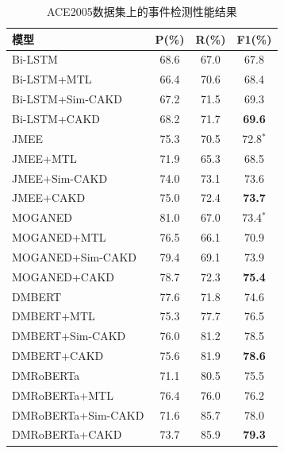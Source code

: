 \begin{table}[htp]
\centering
    \caption{ACE2005数据集上的事件检测性能结果}
	\begin{tabular}{lccc}
		\toprule
		模型 & P(\%) & R(\%) & F1(\%)  \\
		\midrule
		Bi-LSTM            & 68.6  & 67.0  & 67.8      \\
		Bi-LSTM+MTL            & 66.4  & 70.6  & 68.4        \\
		Bi-LSTM+Sim-CAKD   & 67.2  & 71.5  & 69.3      \\
        Bi-LSTM+CAKD   & 68.2  & 71.7  & \textbf{69.6}      \\
        \midrule
		JMEE           & 75.3  & 70.5  & 72.8$^*$      \\
		JMEE+MTL            & 71.9  & 65.3  & 68.5      \\
		JMEE+Sim-CAKD           & 74.0  & 73.1  & 73.6      \\
        JMEE+CAKD           & 75.0  & 72.4  & \textbf{73.7}      \\
        	\midrule
		MOGANED          & 81.0  & 67.0  & 73.4$^*$      \\
		MOGANED+MTL            & 76.5  & 66.1  &  70.9     \\
		MOGANED+Sim-CAKD          & 79.4  & 69.1  & 73.9     \\
        MOGANED+CAKD           & 78.7  & 72.3  & \textbf{75.4}    \\
        	\midrule
        DMBERT & 77.6 & 71.8 & 74.6   \\
	DMBERT+MTL &  75.3 & 77.7  & 76.5    \\
	DMBERT+Sim-CAKD & 76.0  & 81.2  & 78.5 \\
        DMBERT+CAKD & 75.6  & 81.9  & \textbf{78.6}  \\ \midrule
        DMRoBERTa & 71.1 & 80.5 & 75.5   \\
	DMRoBERTa+MTL & 76.4  & 76.0  &  76.2   \\
	DMRoBERTa+Sim-CAKD & 71.6  & 85.7  & 78.0 \\
        DMRoBERTa+CAKD & 73.7  & 85.9  & \textbf{79.3}  \\
		\bottomrule
	\end{tabular}
	\label{tab:event}
\end{table}


